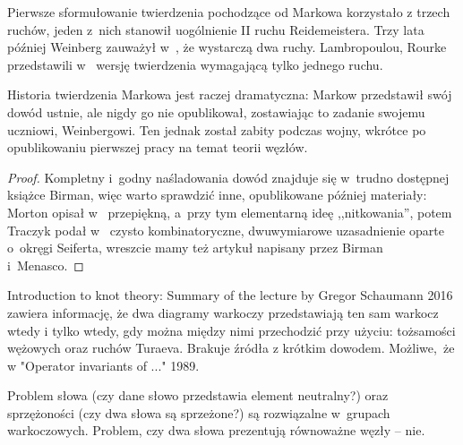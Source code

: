 Pierwsze sformułowanie twierdzenia pochodzące od Markowa \cite{markov36} korzystało z trzech ruchów, jeden z~nich stanowił uogólnienie II ruchu Reidemeistera.
Trzy lata później Weinberg zauważył w~\cite{weinberg39}, że wystarczą dwa ruchy.
Lambropoulou, Rourke przedstawili w~\cite{lambropoulou97} wersję twierdzenia wymagającą tylko jednego ruchu.

Historia twierdzenia Markowa jest raczej dramatyczna: Markow przedstawił swój dowód ustnie, ale nigdy go nie opublikował, zostawiając to zadanie swojemu uczniowi, Weinbergowi.
Ten jednak został zabity podczas wojny, wkrótce po opublikowaniu pierwszej pracy na temat teorii węzłów.

\begin{proof}
    Kompletny i~godny naśladowania dowód znajduje się w~trudno dostępnej książce \cite{birman74} Birman, więc warto sprawdzić inne, opublikowane później materiały:
    Morton opisał w~\cite{mortonhr86} przepiękną, a~przy tym elementarną ideę ,,nitkowania'',
    potem Traczyk podał w~\cite{traczyk98} czysto kombinatoryczne, dwuwymiarowe uzasadnienie oparte o~okręgi Seiferta,
    wreszcie mamy też artykuł \cite{birman02} napisany przez Birman i~Menasco.
\end{proof}

\begin{tobedone}
    Introduction to knot theory: Summary of the lecture by Gregor Schaumann 2016 zawiera informację, że dwa diagramy warkoczy przedstawiają ten sam warkocz wtedy i tylko wtedy, gdy można między nimi przechodzić przy użyciu: tożsamości wężowych oraz ruchów Turaeva.
    Brakuje źródła z krótkim dowodem.
    Możliwe, że w "Operator invariants of ..." 1989.
\end{tobedone}

Problem słowa (czy dane słowo przedstawia element neutralny?) oraz sprzężoności (czy dwa słowa są sprzeżone?) są rozwiązalne w~grupach warkoczowych.
Problem, czy dwa słowa prezentują równoważne węzły -- nie.

